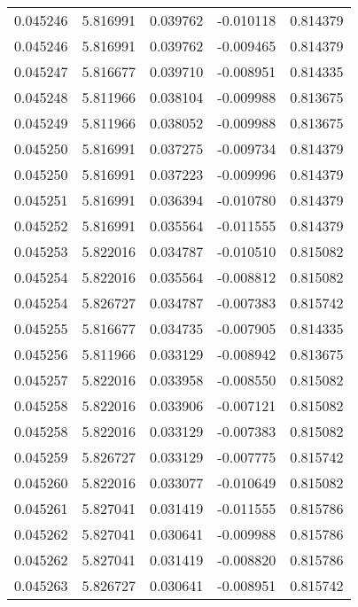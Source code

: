 \begin{tabular}{lrrrr}
0.045246    &  5.816991 &  0.039762 & -0.010118 &             0.814379 \\
0.045246    &  5.816991 &  0.039762 & -0.009465 &             0.814379 \\
0.045247    &  5.816677 &  0.039710 & -0.008951 &             0.814335 \\
0.045248    &  5.811966 &  0.038104 & -0.009988 &             0.813675 \\
0.045249    &  5.811966 &  0.038052 & -0.009988 &             0.813675 \\
0.045250    &  5.816991 &  0.037275 & -0.009734 &             0.814379 \\
0.045250    &  5.816991 &  0.037223 & -0.009996 &             0.814379 \\
0.045251    &  5.816991 &  0.036394 & -0.010780 &             0.814379 \\
0.045252    &  5.816991 &  0.035564 & -0.011555 &             0.814379 \\
0.045253    &  5.822016 &  0.034787 & -0.010510 &             0.815082 \\
0.045254    &  5.822016 &  0.035564 & -0.008812 &             0.815082 \\
0.045254    &  5.826727 &  0.034787 & -0.007383 &             0.815742 \\
0.045255    &  5.816677 &  0.034735 & -0.007905 &             0.814335 \\
0.045256    &  5.811966 &  0.033129 & -0.008942 &             0.813675 \\
0.045257    &  5.822016 &  0.033958 & -0.008550 &             0.815082 \\
0.045258    &  5.822016 &  0.033906 & -0.007121 &             0.815082 \\
0.045258    &  5.822016 &  0.033129 & -0.007383 &             0.815082 \\
0.045259    &  5.826727 &  0.033129 & -0.007775 &             0.815742 \\
0.045260    &  5.822016 &  0.033077 & -0.010649 &             0.815082 \\
0.045261    &  5.827041 &  0.031419 & -0.011555 &             0.815786 \\
0.045262    &  5.827041 &  0.030641 & -0.009988 &             0.815786 \\
0.045262    &  5.827041 &  0.031419 & -0.008820 &             0.815786 \\
0.045263    &  5.826727 &  0.030641 & -0.008951 &             0.815742 \\

\end{tabular}
